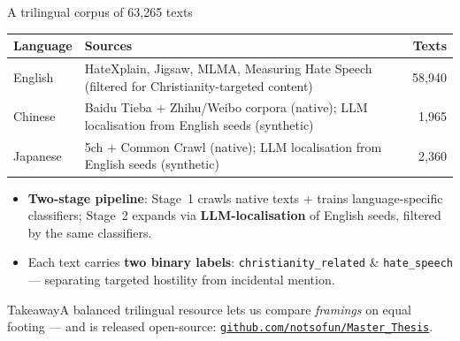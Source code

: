 \documentclass[aspectratio=169,10pt]{beamer}
\newcommand{\emphc}[1]{\textcolor{uzhaccent}{\textbf{#1}}}
\newcommand{\keyword}[1]{\textcolor{uzhblue}{\textbf{#1}}}
\newcommand{\takeaway}[1]{%
  \vspace{0.3em}
  \begin{block}{Takeaway}#1\end{block}}
\begin{document}
\begin{frame}{A trilingual corpus of 63{,}265 texts}
  \vspace{0.2cm}
  \small
    \begin{tabularx}{\textwidth}{l X r}
      \toprule
      \textbf{Language} & \textbf{Sources} & \textbf{Texts} \\
      \midrule
      English  & HateXplain, Jigsaw, MLMA, Measuring Hate Speech
                (filtered for Christianity-targeted content) &
        58{,}940 \\
      Chinese  & Baidu Tieba + Zhihu/Weibo corpora (native);
                LLM localisation from English seeds (synthetic) &
        1{,}965 \\
      Japanese & 5ch + Common Crawl (native);
                LLM localisation from English seeds (synthetic) &
        2{,}360 \\
      \bottomrule
    \end{tabularx}
    \vspace{0.5em}
    \begin{itemize}
      \item \keyword{Two-stage pipeline}: Stage~1 crawls native texts +
        trains language-specific classifiers; Stage~2 expands via
        \keyword{LLM-localisation} of English seeds, filtered by the same classifiers.
      \item Each text carries \emphc{two binary labels}:
        \texttt{christianity\_related} \& \texttt{hate\_speech} —
        separating targeted hostility from incidental mention.
    \end{itemize}
  \takeaway{A balanced trilingual resource lets us compare
  \emph{framings} on equal footing — and is released open-source:
  \href{https://github.com/notsofun/Master_Thesis}{\texttt{github.com/notsofun/Master\_Thesis}}.}
\end{frame}
\end{document}

